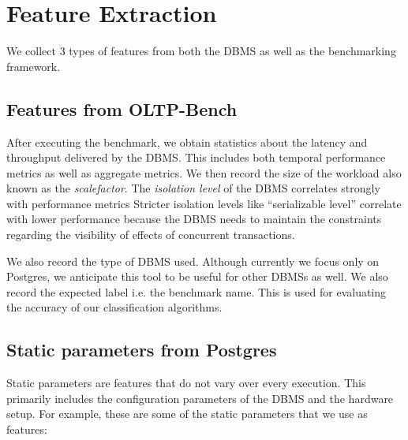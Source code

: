 \section{Feature Extraction} \label{sec:features}

We collect 3 types of features from both the DBMS as well as the benchmarking
framework.

\subsection{Features from OLTP-Bench }

  After executing the benchmark, we obtain statistics about the latency and
  throughput delivered by the DBMS.
  This includes both temporal performance metrics as well as aggregate metrics. 
  We then record the size of the workload also known as the
  \textit{scalefactor}.
  The \textit{isolation level} of the DBMS correlates strongly with performance
  metrics Stricter isolation levels like ``serializable level'' correlate with lower
  performance because the DBMS needs to maintain the constraints regarding
  the visibility of effects of concurrent transactions. 
  
  We also record the type
  of DBMS used. Although currently we focus only on Postgres, 
  we anticipate this tool to be useful for other DBMSs as well.   
  We also record the expected label i.e. the benchmark name. This is used for
  evaluating the accuracy of our classification algorithms.  
  
\subsection{Static parameters from Postgres}

  Static parameters are features that do not vary over every execution. This
  primarily includes the configuration parameters of the DBMS and the hardware
  setup.
  For example, these are some of the static parameters that we use as features:\\
   
